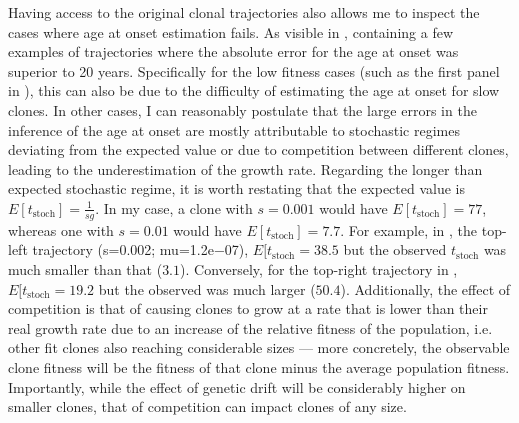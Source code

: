 \begin{figure}[!ht]
	\label{fig:age-at-onset-vs-true-fitness-sim}
\end{figure}

Having access to the original clonal trajectories also allows me to inspect the cases where age at onset estimation fails. As visible in , containing a few examples of trajectories where the absolute error for the age at onset was superior to 20 years. Specifically for the low fitness cases (such as the first panel in ), this can also be due to the difficulty of estimating the age at onset for slow clones. In other cases, I can reasonably postulate that the large errors in the inference of the age at onset are mostly attributable to stochastic regimes deviating from the expected value or due to competition between different clones, leading to the underestimation of the growth rate. Regarding the longer than expected stochastic regime, it is worth restating that the expected value is $E[t_{\mathrm{stoch}}] = \frac{1}{sg}$. In my case, a clone with $s=0.001$ would have $E[t_{\mathrm{stoch}}] = 77$, whereas one with $s=0.01$ would have $E[t_{\mathrm{stoch}}] = 7.7$. For example, in , the top-left trajectory (s=0.002; mu=1.2e−07), $E[t_{\mathrm{stoch}} = 38.5$ but the observed $t_{\mathrm{stoch}}$ was much smaller than that ($3.1$). Conversely, for the top-right trajectory in , $E[t_{\mathrm{stoch}} = 19.2$ but the observed was much larger ($50.4$). Additionally, the effect of competition is that of causing clones to grow at a rate that is lower than their real growth rate due to an increase of the relative fitness of the population, i.e. other fit clones also reaching considerable sizes --- more concretely, the observable clone fitness will be the fitness of that clone minus the average population fitness. Importantly, while the effect of genetic drift will be considerably higher on smaller clones, that of competition can impact clones of any size.

\begin{figure}[!ht]
	\label{fig:examples-bad-inference}
\end{figure}

